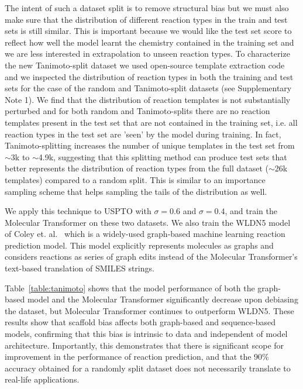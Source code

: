 The intent of such a dataset split is to remove structural bias but we must also make sure that the distribution of different reaction types in the train and test sets is still similar. This is important because we would like the test set score to reflect how well the model learnt the chemistry contained in the training set and we are less interested in extrapolation to unseen reaction types. To characterize the new Tanimoto-split dataset we used open-source template extraction code~\cite{Coley19WLDN5} and we inspected the distribution of reaction types in both the training and test sets for the case of the random and Tanimoto-split datasets (see Supplementary Note 1). We find that the distribution of reaction templates is not substantially perturbed and for both random and Tanimoto-splits there are no reaction templates present in the test set that are not contained in the training set, i.e. all reaction types in the test set are 'seen' by the model during training. In fact, Tanimoto-splitting increases the number of unique templates in the test set from $\sim$3k to $\sim$4.9k, suggesting that this splitting method can produce test sets that better represents the distribution of reaction types from the full dataset ($\sim$26k templates) compared to a random split. This is similar to an importance sampling scheme that helps sampling the tails of the distribution as well.

We apply this technique to USPTO with $\sigma = 0.6$ and $\sigma = 0.4$, and train the Molecular Transformer on these two datasets. We also train the WLDN5 model of Coley et. al.~\cite{Coley19WLDN5} which is a widely-used graph-based machine learning reaction prediction model. This model explicitly represents molecules as graphs and considers reactions as series of graph edits instead of the Molecular Transformer's text-based translation of SMILES strings. 

Table~\ref{table:tanimoto} shows that the model performance of both the graph-based model and the Molecular Transformer significantly decrease upon debiasing the dataset, but Molecular Transformer continues to outperform WLDN5.  These results show that scaffold bias affects both graph-based and sequence-based models, confirming that this bias is intrinsic to data and independent of model architecture. Importantly, this demonstrates that there is significant scope for improvement in the performance of reaction prediction, and that the 90\% accuracy obtained for a randomly split dataset does not necessarily translate to real-life applications.


